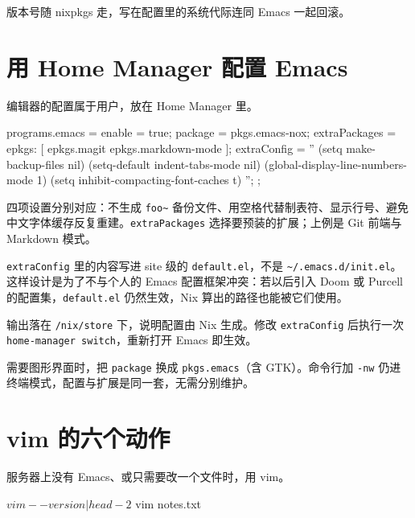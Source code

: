 版本号随 nixpkgs 走，写在配置里的系统代际连同 Emacs 一起回滚。

\section{用 Home Manager 配置 Emacs}

编辑器的配置属于用户，放在 Home Manager 里。

\begin{nixcode}
programs.emacs = {
  enable = true;
  package = pkgs.emacs-nox;
  extraPackages = epkgs: [
    epkgs.magit
    epkgs.markdown-mode
  ];
  extraConfig = ''
    (setq make-backup-files nil)
    (setq-default indent-tabs-mode nil)
    (global-display-line-numbers-mode 1)
    (setq inhibit-compacting-font-caches t)
  '';
};
\end{nixcode}

四项设置分别对应：不生成 \texttt{foo\textasciitilde} 备份文件、用空格代替制表符、显示行号、避免中文字体缓存反复重建。\texttt{extraPackages} 选择要预装的扩展；上例是 Git 前端与 Markdown 模式。

\texttt{extraConfig} 里的内容写进 site 级的 \texttt{default.el}，不是 \texttt{\textasciitilde/.emacs.d/init.el}。这样设计是为了不与个人的 Emacs 配置框架冲突：若以后引入 Doom 或 Purcell 的配置集，\texttt{default.el} 仍然生效，Nix 算出的路径也能被它们使用。


输出落在 \texttt{/nix/store} 下，说明配置由 Nix 生成。修改 \texttt{extraConfig} 后执行一次 \texttt{home-manager switch}，重新打开 Emacs 即生效。

\begin{notebox}[图形界面与终端共用一份配置]
需要图形界面时，把 \texttt{package} 换成 \texttt{pkgs.emacs}（含 GTK）。命令行加 \texttt{-nw} 仍进终端模式，配置与扩展是同一套，无需分别维护。
\end{notebox}

\section{vim 的六个动作}

服务器上没有 Emacs、或只需要改一个文件时，用 vim。

\begin{shellsession}
$ vim --version | head -2
$ vim notes.txt
\end{shellsession}

